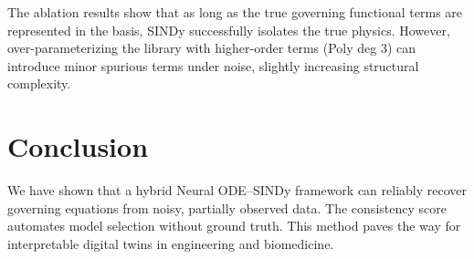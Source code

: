 \documentclass{article}
\begin{document}
The ablation results show that as long as the true governing functional terms are represented in the basis, SINDy successfully isolates the true physics. However, over-parameterizing the library with higher-order terms (Poly deg 3) can introduce minor spurious terms under noise, slightly increasing structural complexity.

\section{Conclusion}
We have shown that a hybrid Neural ODE–SINDy framework can reliably recover governing equations from noisy, partially observed data. The consistency score automates model selection without ground truth. This method paves the way for interpretable digital twins in engineering and biomedicine.



\end{document}
